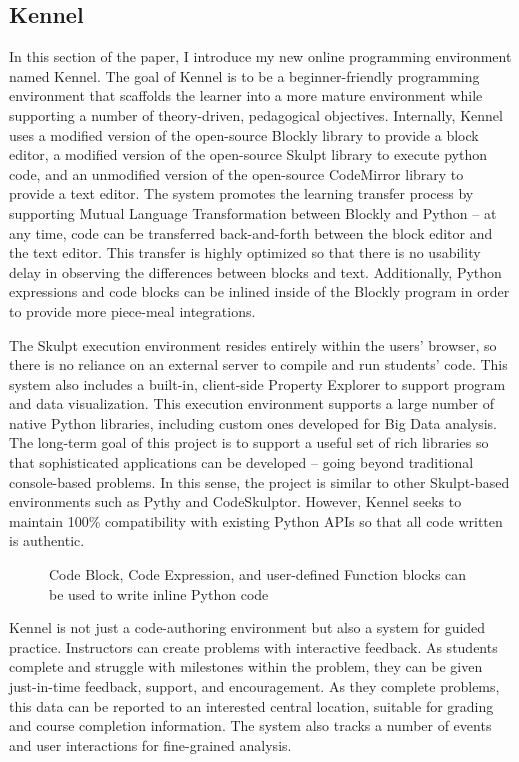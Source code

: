\subsection{Kennel}

In this section of the paper, I introduce my new online programming environment named Kennel.
The goal of Kennel is to be a beginner-friendly programming environment that scaffolds the learner into a more mature environment while supporting a number of theory-driven, pedagogical objectives.
Internally, Kennel uses a modified version of the open-source Blockly library to provide a block editor, a modified version of the open-source Skulpt library to execute python code, and an unmodified version of the open-source CodeMirror library to provide a text editor.
The system promotes the learning transfer process by supporting Mutual Language Transformation between Blockly and Python -- at any time, code can be transferred back-and-forth between the block editor and the text editor.
This transfer is highly optimized so that there is no usability delay in observing the differences between blocks and text.
Additionally, Python expressions and code blocks can be inlined inside of the Blockly program in order to provide more piece-meal integrations.

The Skulpt execution environment resides entirely within the users' browser, so there is no reliance on an external server to compile and run students' code.
This system also includes a built-in, client-side Property Explorer to support program and data visualization.
This execution environment supports a large number of native Python libraries, including custom ones developed for Big Data analysis.
The long-term goal of this project is to support a useful set of rich libraries so that sophisticated applications can be developed -- going beyond traditional console-based problems.
In this sense, the project is similar to other Skulpt-based environments such as Pythy and CodeSkulptor.
However, Kennel seeks to maintain 100\% compatibility with existing Python APIs so that all code written is authentic.

\begin{wrapfigure}{R}{0.5\textwidth}
\label{fig-blockly-custom}
\caption{Code Block, Code Expression, and user-defined Function blocks can be used to write inline Python code}
\end{wrapfigure}

Kennel is not just a code-authoring environment but also a system for guided practice.
Instructors can create problems with interactive feedback.
As students complete and struggle with milestones within the problem, they can be given just-in-time feedback, support, and encouragement.
As they complete problems, this data can be reported to an interested central location, suitable for grading and course completion information.
The system also tracks a number of events and user interactions for fine-grained analysis.

